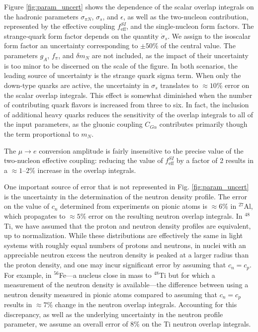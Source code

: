 \documentclass{book}[letterpaper,12pt]
\begin{document}
Figure \ref{fig:param_uncert} shows the dependence of the scalar overlap integrals on the hadronic parameters $\sigma_{\pi N}$, $\sigma_s$, and $\epsilon$, as well as the two-nucleon contribution, represented by the effective coupling $f_\mathrm{eff}^{SI}$, and the single-nucleon form factors. The strange-quark form factor depends on the quantity $\dot{\sigma}_s$. We assign to the isoscalar form factor an uncertainty corresponding to $\pm 50\%$ of the central value. The parameters $g_A$, $f_{\pi}$, and $\delta m_N$ are not included, as the impact of their uncertainty is too minor to be discerned on the scale of the figure. In both scenarios, the leading source of uncertainty is the strange quark sigma term. When only the down-type quarks are active, the uncertainty in $\sigma_s$ translates to $\approx 10\%$ error on the scalar overlap integrals. This effect is somewhat diminished when the number of contributing quark flavors is increased from three to six. In fact, the inclusion of additional heavy quarks reduces the sensitivity of the overlap integrals to all of the input parameters, as the gluonic coupling $C_{G\alpha}$ contributes primarily though the term proportional to $m_N$. 

The $\mu\rightarrow e$ conversion amplitude is fairly insensitive to the precise value of the two-nucleon effective coupling: reducing the value of $f^{SI}_\mathrm{eff}$ by a factor of 2 results in a $\approx 1$--$2\%$ increase in the overlap integrals.

One important source of error that is not represented in Fig. \ref{fig:param_uncert} is the uncertainty in the determination of the neutron density profile. The error on the value of $c_n$ determined from experiments on pionic atoms is $\approx 6\%$ in $^{27}$Al, which propagates to $\approx 5\%$ error on the resulting neutron overlap integrals. In $^{48}$Ti, we have assumed that the proton and neutron density profiles are equivalent, up to normalization. While these distributions are effectively the same in light systems with roughly equal numbers of protons and neutrons, in nuclei with an appreciable neutron excess the neutron density is peaked at a larger radius than the proton density, and one may incur significant error by assuming that $c_n=c_p$. For example, in $^{56}$Fe---a nucleus close in mass to $^{48}$Ti but for which a measurement of the neutron density is available---the difference between using a neutron density measured in pionic atoms compared to assuming that $c_n=c_p$ results in $\approx 7\%$ change in the neutron overlap integrals. Accounting for this discrepancy, as well as the underlying uncertainty in the neutron profile parameter, we assume an overall error of $8\%$ on the Ti neutron overlap integrals.
\end{document}
